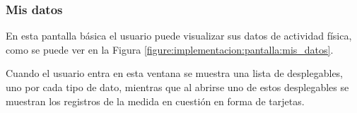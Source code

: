                 \clearpage  %

            \subsubsection*{Mis datos}
                En esta pantalla básica el usuario puede visualizar sus datos de actividad física, como se puede ver en la Figura \ref{figure:implementacion:pantalla:mis_datos}.

                Cuando el usuario entra en esta ventana se muestra una lista de desplegables, uno por cada tipo de dato, mientras que al abrirse uno de estos desplegables se muestran los registros de la medida en cuestión en forma de tarjetas.
                
